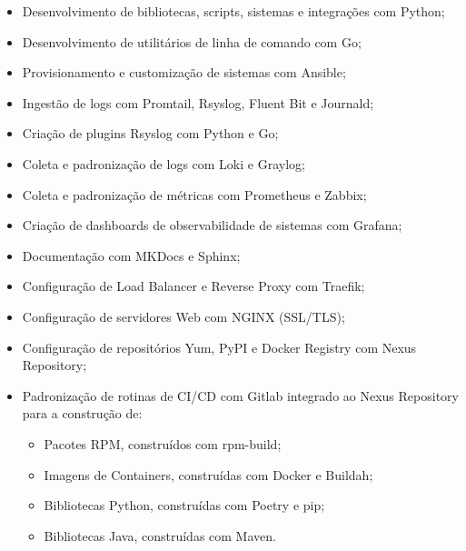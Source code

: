 \documentclass[10pt,a4paper]{altacv}
\begin{document}
\begin{itemize}
    \item Desenvolvimento de bibliotecas, scripts, sistemas e integrações com Python;
    \item Desenvolvimento de utilitários de linha de comando com Go;
    \item Provisionamento e customização de sistemas com Ansible;
    \item Ingestão de logs com Promtail, Rsyslog, Fluent Bit e Journald;
    \item Criação de plugins Rsyslog com Python e Go;
    \item Coleta e padronização de logs com Loki e Graylog; 
    \item Coleta e  padronização de métricas com Prometheus e Zabbix;
    \item Criação de dashboards de observabilidade de sistemas com Grafana;
    \item Documentação com MKDocs e Sphinx;
    \item Configuração de Load Balancer e Reverse Proxy com Traefik;
    \item Configuração de servidores Web com NGINX (SSL/TLS);
    \item Configuração de repositórios Yum, PyPI e Docker Registry com Nexus Repository;
    \item Padronização de rotinas de CI/CD com Gitlab integrado ao Nexus Repository para a construção de:
        \begin{itemize}
            \item Pacotes RPM, construídos com rpm-build;
            \item Imagens de Containers, construídas com Docker e Buildah;
            \item Bibliotecas Python, construídas com Poetry e pip;
            \item Bibliotecas Java, construídas com Maven.
        \end{itemize}

\end{itemize}
\end{document}
